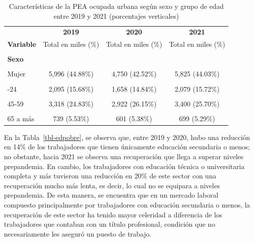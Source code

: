 \documentclass[
  letterpaper,
  12pt,
  oneside,
  spanish,
  doublespacing,
  headsepline,
  parskip]{MastersDoctoralThesis}
\begin{document}
\hypertarget{tbl-peasexeda}{}
\begin{table}[H]
\caption{\label{tbl-peasexeda}Características de la PEA ocupada urbana según sexo y grupo de edad
entre 2019 y 2021 (porcentajes verticales) }\tabularnewline

\centering\begingroup\fontsize{10}{12}\selectfont

\begin{tabular}{lccc}
\toprule
\multicolumn{1}{c}{ } & \multicolumn{1}{c}{\textbf{2019}} & \multicolumn{1}{c}{\textbf{2020}} & \multicolumn{1}{c}{\textbf{2021}} \\
\cmidrule(l{3pt}r{3pt}){2-2} \cmidrule(l{3pt}r{3pt}){3-3} \cmidrule(l{3pt}r{3pt}){4-4}
\textbf{Variable} & Total en miles (\%) & Total en miles (\%) & Total en miles (\%)\\
\midrule
\cellcolor{gray!6}{\textbf{Nacional}} & \cellcolor{gray!6}{13,360 (100.00\%)} & \cellcolor{gray!6}{11,172 (100.00\%)} & \cellcolor{gray!6}{13,229 (100.00\%)}\\
\textbf{Sexo} &  &  & \\
\cellcolor{gray!6}{Hombre} & \cellcolor{gray!6}{7,364 (55.12\%)} & \cellcolor{gray!6}{6,421 (57.48\%)} & \cellcolor{gray!6}{7,405 (55.97\%)}\\
Mujer & 5,996 (44.88\%) & 4,750 (42.52\%) & 5,825 (44.03\%)\\
\cellcolor{gray!6}{\textbf{Grupos de edad}} & \cellcolor{gray!6}{} & \cellcolor{gray!6}{} & \cellcolor{gray!6}{}\\
\addlinespace
14-24 & 2,095 (15.68\%) & 1,658 (14.84\%) & 2,079 (15.72\%)\\
\cellcolor{gray!6}{25-44} & \cellcolor{gray!6}{6,442 (48.21\%)} & \cellcolor{gray!6}{5,445 (48.74\%)} & \cellcolor{gray!6}{6,421 (48.53\%)}\\
45-59 & 3,318 (24.83\%) & 2,922 (26.15\%) & 3,400 (25.70\%)\\
\cellcolor{gray!6}{60-64} & \cellcolor{gray!6}{767 (5.74\%)} & \cellcolor{gray!6}{546 (4.89\%)} & \cellcolor{gray!6}{630 (4.76\%)}\\
65 a más & 739 (5.53\%) & 601 (5.38\%) & 699 (5.29\%)\\
\bottomrule
\end{tabular}
\endgroup{}
\end{table}

En la Tabla~\ref{tbl-edpobre}, se observa que, entre 2019 y 2020, hubo
una reducción en 14\% de los trabajadores que tienen únicamente
educación secundaria o menos; no obstante, hacia 2021 se observa una
recuperación que llega a superar niveles prepandemia. En cambio, los
trabajadores con educación técnica o universitaria completa y más
tuvieron una reducción en 20\% de este sector con una recuperación mucho
más lenta, es decir, lo cual no se equipara a niveles prepandemia. De
esta manera, se encuentra que en un mercado laboral compuesto
principalmente por trabajadores con educación secundaria o menos, la
recuperación de este sector ha tenido mayor celeridad a diferencia de
los trabajadores que contaban con un título profesional, condición que
no necesariamente les aseguró un puesto de trabajo.
\end{document}
